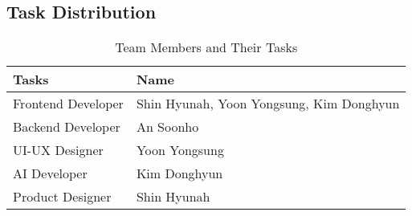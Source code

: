 \documentclass[conference, a4paper]{IEEEtran}
\begin{document}
\subsection{Task Distribution}



\begin{table}[h]
\centering
\caption{Team Members and Their Tasks}
\renewcommand{\arraystretch}{1.5}
\begin{tabular}{| p{3cm}|p{3cm}|}

\hline
Tasks & Name \\

\hline
Frontend Developer & Shin Hyunah, Yoon Yongsung, Kim Donghyun \\

\hline
Backend Developer & An Soonho\\

\hline
UI-UX Designer & Yoon Yongsung\\

\hline
AI Developer & Kim Donghyun \\

\hline
Product Designer & Shin Hyunah \\

\hline
\end{tabular}
\end{table}




\end{document}
